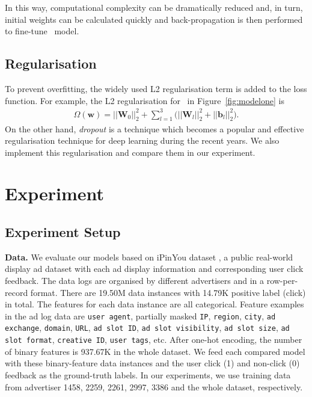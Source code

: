 \documentclass{llncs}
\newcommand{\bs}{\boldsymbol}
\newcommand{\ft}{\texttt}
\newcommand{\fmnn}{\text{FNN}}
\newcommand{\snn}{\text{SNN}}
\begin{document}
In this way, computational complexity can be dramatically reduced and, in turn, initial weights can be calculated quickly and back-propagation is then performed to fine-tune \snn~model.


\subsection{Regularisation}\vspace{-2pt}
To prevent overfitting, the widely used L2 regularisation term is added to the loss function. For example, the L2 regularisation for \fmnn~in Figure~\ref{fig:modelone} is
\begin{align}
\Omega(\bs{w})=||\bs{W}_{0}||_2^{2}+\sum_{l=1}^3 \Big( ||\bs{W}_{l}||_2^{2}+||\bs{b}_{l}||_2^{2} \Big). \label{eq:xdefreg}
\end{align}
On the other hand, \emph{dropout} \cite{srivastava2014dropout} is a technique which becomes a popular and effective regularisation technique for deep learning during the recent years. We also implement this regularisation and compare them in our experiment.

\vspace{-5pt}
\section{Experiment}\label{sec:exp}
\vspace{-3pt}
\subsection{Experiment Setup}
\textbf{Data.} We evaluate our models based on iPinYou dataset \cite{liao2014ipinyou}, a public real-world display ad dataset with each ad display information and corresponding user click feedback. The data logs are organised by different advertisers and in a row-per-record format. There are 19.50M data instances with 14.79K positive label (click) in total. The features for each data instance are all categorical. Feature examples in the ad log data are \ft{user agent}, partially masked \ft{IP}, \ft{region}, \ft{city}, \ft{ad exchange}, \ft{domain}, \ft{URL}, \ft{ad slot ID}, \ft{ad slot visibility}, \ft{ad slot size}, \ft{ad slot format}, \ft{creative ID}, \ft{user tags}, etc. After one-hot encoding, the number of binary features is 937.67K in the whole dataset. We feed each compared model with these binary-feature data instances and the user click (1) and non-click (0) feedback as the ground-truth labels. In our experiments, we use training data from advertiser 1458, 2259, 2261, 2997, 3386 and the whole dataset, respectively.
\end{document}
